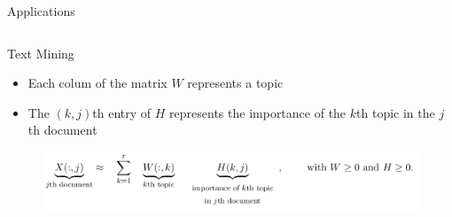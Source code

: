 \documentclass[final]{beamer}
\newlength{\onecolwid}
\newlength{\threecolwid}
\begin{document}
\begin{frame}
\begin{columns}[t]
\begin{column}{\threecolwid}
\begin{exampleblock}{Applications}
\begin{columns}[t]
\begin{column}{\onecolwid}
\begin{block}{Text Mining}
\begin{itemize}
    \item Each colum of the matrix $W$ represents a topic
    \item The $(k,j)$th entry of $H$ represents the importance of the $k$th topic in the $j$th document
\end{itemize}
\begin{figure}
    \centering
    \includegraphics{../images/NMF_app2.png}
\end{figure}
\end{block}
\end{column}
\end{columns}
\end{exampleblock}


\end{column}
\end{columns}
\end{frame}
\end{document}
